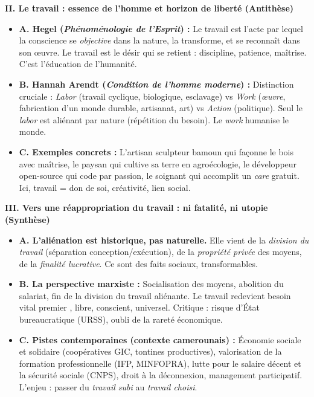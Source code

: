 \documentclass[11pt]{article}
\begin{document}
\begin{exoresolu}
\textbf{II. Le travail : essence de l'homme et horizon de liberté (Antithèse)}
\begin{itemize}
    \item \textbf{A. Hegel (\emph{Phénoménologie de l'Esprit}) :} Le travail est l'acte par lequel la conscience se \emph{objective} dans la nature, la transforme, et se reconnaît dans son œuvre. \guillemotleft Le travail est le désir qui se retient \guillemotright : discipline, patience, maîtrise. C'est l'éducation de l'humanité.
    \item \textbf{B. Hannah Arendt (\emph{Condition de l'homme moderne}) :} Distinction cruciale : \emph{Labor} (travail cyclique, biologique, esclavage) vs \emph{Work} (\emph{œuvre}, fabrication d'un monde durable, artisanat, art) vs \emph{Action} (politique). Seul le \emph{labor} est aliénant par nature (répétition du besoin). Le \emph{work} humanise le monde.
    \item \textbf{C. Exemples concrets :} L'artisan sculpteur bamoun qui façonne le bois avec maîtrise, le paysan qui cultive sa terre en agroécologie, le développeur open-source qui code par passion, le soignant qui accomplit un \emph{care} gratuit. Ici, travail = don de soi, créativité, lien social.
\end{itemize}

\textbf{III. Vers une réappropriation du travail : ni fatalité, ni utopie (Synthèse)}
\begin{itemize}
    \item \textbf{A. L'aliénation est historique, pas naturelle.} Elle vient de la \emph{division du travail} (séparation conception/exécution), de la \emph{propriété privée} des moyens, de la \emph{finalité lucrative}. Ce sont des faits sociaux, transformables.
    \item \textbf{B. La perspective marxiste :} Socialisation des moyens, abolition du salariat, fin de la division du travail aliénante. Le travail redevient \guillemotleft besoin vital premier \guillemotright, libre, conscient, universel. Critique : risque d'État bureaucratique (URSS), oubli de la rareté économique.
    \item \textbf{C. Pistes contemporaines (contexte camerounais) :} Économie sociale et solidaire (coopératives GIC, tontines productives), valorisation de la formation professionnelle (IFP, MINFOPRA), lutte pour le salaire décent et la sécurité sociale (CNPS), droit à la déconnexion, management participatif. L'enjeu : passer du \emph{travail subi} au \emph{travail choisi}.
\end{itemize}


\end{exoresolu}
\end{document}
